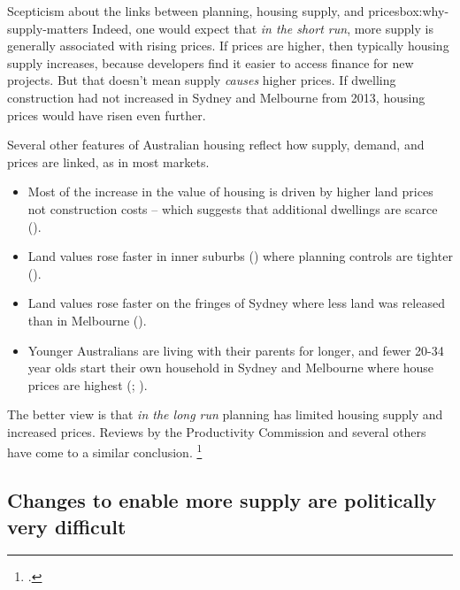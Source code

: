 \begin{bigbox}{Scepticism about the links between planning, housing supply, and prices}{box:why-supply-matters}
Indeed, one would expect that \textit{in the short run}, more supply is generally associated with rising prices.
If prices are higher, then typically housing supply increases, because developers find it easier to access finance for new projects.
But that doesn't mean supply \emph{causes} higher prices. If dwelling construction had not increased in Sydney and Melbourne from 2013, housing prices would have risen even further. 

Several other features of Australian housing reflect how supply, demand, and prices are linked, as in most markets.
\begin{itemize}
\item
Most of the increase in the value of housing is driven by higher land prices not construction costs -- which suggests that additional dwellings are scarce ().
\item
Land values rose faster in inner suburbs () where planning controls are tighter ().
\item
Land values rose faster on the fringes of Sydney where less land was released than in Melbourne ().
\item
Younger Australians are living with their parents for longer, and fewer 20-34 year olds start their own household in Sydney and Melbourne where house prices are highest (; ).
\end{itemize}

The better view is that \textit{in the long run} planning has limited housing supply and increased prices.
Reviews by the Productivity Commission and several others have come to a similar conclusion.%
    \footcites{ProductivityCommission2004FirstHomeOwnership}{RBA2014SubmissionAffordableHousingInquiry}{SenateEconomicsRefAffordableHousing2015}{Stevens-2017-Report-to-NSW-Premier-Housing-affordaibility}


\end{bigbox}

\subsection{Changes to enable more supply are politically very difficult}\label{subsec:changes-to-enable-more-supply-are-politically-very-difficult}

